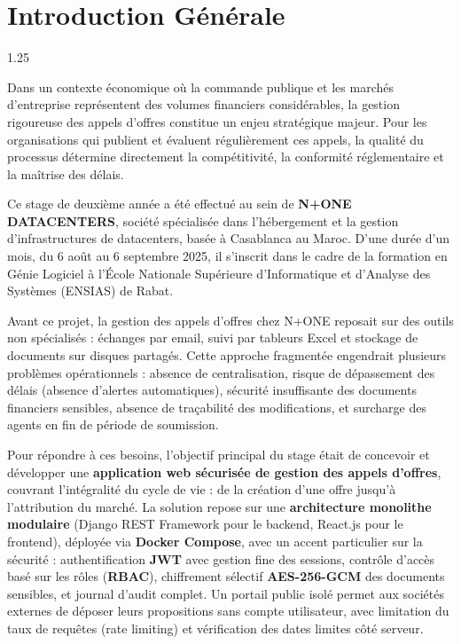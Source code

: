 \chapter*{Introduction Générale}

\begin{spacing}{1.25}

Dans un contexte économique où la commande publique et les marchés d'entreprise représentent des volumes financiers considérables, la gestion rigoureuse des appels d'offres constitue un enjeu stratégique majeur. Pour les organisations qui publient et évaluent régulièrement ces appels, la qualité du processus détermine directement la compétitivité, la conformité réglementaire et la maîtrise des délais.

\vspace{0.4cm}

Ce stage de deuxième année a été effectué au sein de \textbf{N+ONE DATACENTERS}, société spécialisée dans l'hébergement et la gestion d'infrastructures de datacenters, basée à Casablanca au Maroc. D'une durée d'un mois, du 6 août au 6 septembre 2025, il s'inscrit dans le cadre de la formation en Génie Logiciel à l'École Nationale Supérieure d'Informatique et d'Analyse des Systèmes (ENSIAS) de Rabat.

\vspace{0.4cm}

Avant ce projet, la gestion des appels d'offres chez N+ONE reposait sur des outils non spécialisés : échanges par email, suivi par tableurs Excel et stockage de documents sur disques partagés. Cette approche fragmentée engendrait plusieurs problèmes opérationnels : absence de centralisation, risque de dépassement des délais (absence d'alertes automatiques), sécurité insuffisante des documents financiers sensibles, absence de traçabilité des modifications, et surcharge des agents en fin de période de soumission.

\vspace{0.4cm}

Pour répondre à ces besoins, l'objectif principal du stage était de concevoir et développer une \textbf{application web sécurisée de gestion des appels d'offres}, couvrant l'intégralité du cycle de vie : de la création d'une offre jusqu'à l'attribution du marché. La solution repose sur une \textbf{architecture monolithe modulaire} (Django REST Framework pour le backend, React.js pour le frontend), déployée via \textbf{Docker Compose}, avec un accent particulier sur la sécurité : authentification \textbf{JWT} avec gestion fine des sessions, contrôle d'accès basé sur les rôles (\textbf{RBAC}), chiffrement sélectif \textbf{AES-256-GCM} des documents sensibles, et journal d'audit complet. Un portail public isolé permet aux sociétés externes de déposer leurs propositions sans compte utilisateur, avec limitation du taux de requêtes (rate limiting) et vérification des dates limites côté serveur.


\end{spacing}
